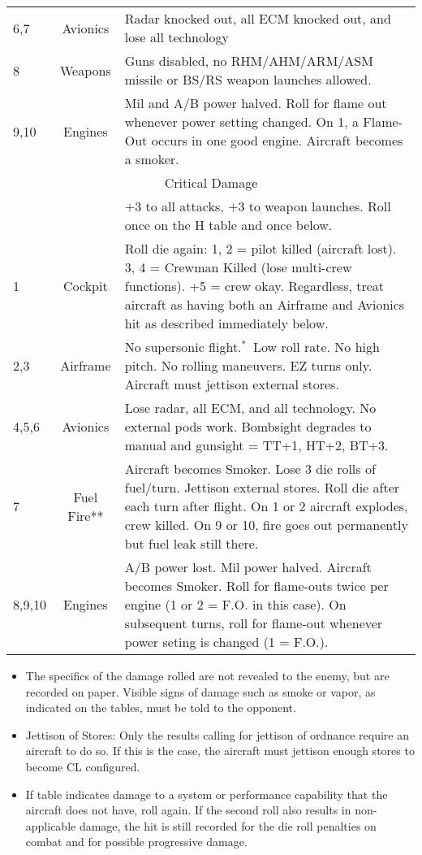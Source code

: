 {\begin{twocolumntablefloat}
\begin{twocolumntable}
{\begin{tabularx}{\linewidth}{lcX}
6,7&Avionics&Radar knocked out, all ECM knocked out, and lose all technology\\
8&Weapons&Guns disabled, no RHM/AHM/ARM/ASM missile or BS/RS weapon launches allowed.\\
9,10&Engines&Mil and A/B power halved. Roll for flame out whenever power setting changed. On 1, a Flame-Out occurs in one good engine. Aircraft becomes a smoker.\\
\midrule
\multicolumn{3}{c}{Critical Damage}\\
\midrule
&&$+3$ to all attacks, $+3$ to weapon launches. Roll once on the H table and once below.\\
1&Cockpit&Roll die again: 1, 2 = pilot killed (aircraft lost). 3, 4 = Crewman Killed (lose multi-crew functions). +5 = crew okay. Regardless, treat aircraft as having both an Airframe and Avionics hit as described immediately below.\\
2,3&Airframe&
No supersonic flight.$^*$~Low roll rate. No high pitch. No rolling maneuvers. EZ turns only. Aircraft must jettison external stores.\\
4,5,6&Avionics&Lose radar, all ECM, and all technology. No external pods work. Bombsight degrades to manual and gunsight = TT+1, HT+2, BT+3.\\
7&Fuel Fire**&Aircraft becomes Smoker. Lose 3 die rolls of fuel/turn. Jettison external stores. Roll die after each turn after flight. On 1 or 2 aircraft explodes, crew killed. On 9 or 10, fire goes out permanently but fuel leak still there.\\
8,9,10&Engines&A/B power lost. Mil power halved. Aircraft becomes Smoker. Roll for flame-outs twice per engine (1 or 2 = F.O. in this case). On subsequent turns, roll for flame-out whenever power seting is changed (1 = F.O.).\\
\bottomrule
\end{tabularx}
\begin{tablenote}{\linewidth}
\begin{itemize}
    \item The specifics of the damage rolled are not revealed to the enemy, but are recorded on paper. Visible signs of damage such as smoke or vapor, as indicated on the tables, must be told to the opponent.
    \item Jettison of Stores: Only the results calling for jettison of ordnance require an aircraft to do so. If this is the case, the aircraft must jettison enough stores to become CL configured. 
    \item If table indicates damage to a system or performance capability that the aircraft does not have, roll again. If the second roll also results in non-applicable damage, the hit is still recorded for the die roll penalties on combat and for possible progressive damage.

\end{itemize}
\end{tablenote}}
\end{twocolumntable}
\end{twocolumntablefloat}}
